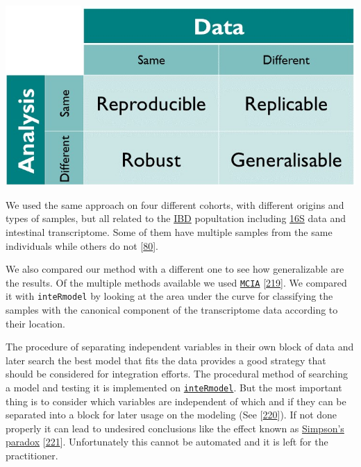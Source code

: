 \documentclass[
  12pt,
  a4paper,
  twoside,
  openright]{book}
\let\origfigure\figure
\let\endorigfigure\endfigure
\renewenvironment{figure}[1][2] {
    \expandafter\origfigure\expandafter[!htbp]
} {
    \endorigfigure
}
\begin{document}
\begin{figure}
\includegraphics[width=1\linewidth]{images/turing_way_reproducible-matrix} \caption[Reproducibility matrix]{Reproducibility matrix indicating the terminology used between using the same method and the same data. Figure from The Turing Way: A Handbook for Reproducible Data Science (Version v1.0.1).}\label{fig:reproducible-matrix}
\end{figure}

We used the same approach on four different cohorts, with different origins and types of samples, but all related to the \protect\hyperlink{acronyms_IBD}{IBD} popultation including \protect\hyperlink{acronyms_16S}{16S} data and intestinal transcriptome.
Some of them have multiple samples from the same individuals while others do not {[}\protect\hyperlink{ref-hasler_uncoupling_2016}{80}{]}.

We also compared our method with a different one to see how generalizable are the results.
Of the multiple methods available we used \href{https://bioconductor.org/packages/omicade4}{\texttt{MCIA}} {[}\protect\hyperlink{ref-mengMultivariateApproachIntegration2014}{219}{]}.
We compared it with \texttt{inteRmodel} by looking at the area under the curve for classifying the samples with the canonical component of the transcriptome data according to their location.

The procedure of separating independent variables in their own block of data and later search the best model that fits the data provides a good strategy that should be considered for integration efforts.
The procedural method of searching a model and testing it is implemented on \href{https://llrs.github.io/inteRmodel/}{\texttt{inteRmodel}}.
But the most important thing is to consider which variables are independent of which and if they can be separated into a block for later usage on the modeling (See {[}\protect\hyperlink{ref-pearl2011}{220}{]}).
If not done properly it can lead to undesired conclusions like the effect known as \href{https://en.wikipedia.org/wiki/Simpson\%27s_paradox}{Simpson's paradox} {[}\protect\hyperlink{ref-simpson1951}{221}{]}.
Unfortunately this cannot be automated and it is left for the practitioner.
\end{document}
